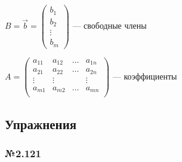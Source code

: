 \documentclass{article}
\begin{document}
$B = \vec{b} = \begin{pmatrix}
	b_1 \\
	b_2 \\
	\vdots \\
	b_m
\end{pmatrix}$ --- свободные члены

$A = \begin{pmatrix}
	a_{11} & a_{12} & \dots & a_{1n} \\
	a_{21} & a_{22} & \dots & a_{2n} \\
	\vdots & \vdots & & \vdots \\
	a_{m1} & a_{m2} & \dots & a_{mn} \\
\end{pmatrix}$ --- коэффициенты

\subsection{Упражнения}

\subsubsection*{№2.121}
\end{document}
